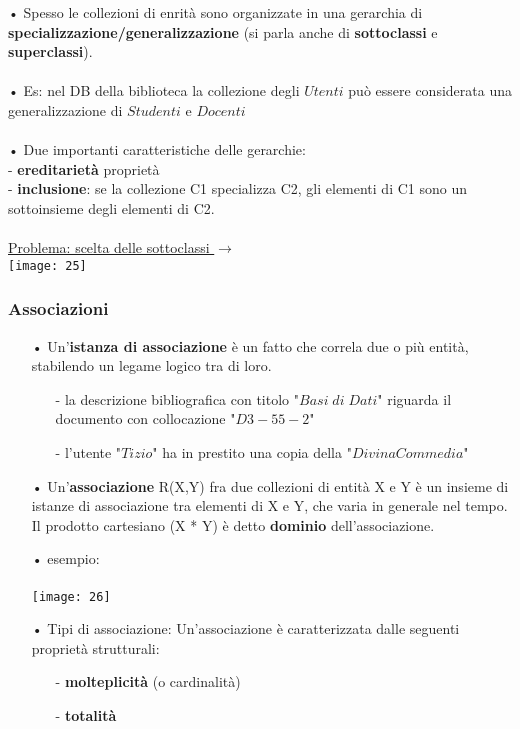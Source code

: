 \documentclass[12pt, letterpaper]{article}
\begin{document}
• Spesso le collezioni di enrità sono organizzate in una gerarchia di \textbf{specializzazione/generalizzazione} (si parla anche di 
\textbf{sottoclassi} e \textbf{superclassi}).
\\
\\
• Es: nel DB della biblioteca la collezione degli $Utenti$ può essere considerata una 
generalizzazione di $Studenti$ e $Docenti$
\\
\\
• Due importanti caratteristiche delle gerarchie:
\\- \textbf{ereditarietà} proprietà 
\\-\textbf{ inclusione}: se la collezione C1 specializza C2, gli elementi di C1 sono un sottoinsieme degli elementi di C2.
\\
\\
\underline{Problema: scelta delle sottoclassi $\rightarrow$}\\
\texttt{[image: 25]}

\subsubsection{Associazioni}

\begin{itemize}
   \item[•] Un'\textbf{istanza di associazione} è un fatto che correla due o più entità, 
      stabilendo un legame logico tra di loro.
      \begin{itemize}
         \item[-] la descrizione bibliografica con titolo "$Basi\;di\;Dati$" riguarda il documento 
            con collocazione "$D3-55-2$"
         \item[-] l'utente "$Tizio$" ha in prestito una copia della "$Divina Commedia$"
      \end{itemize}
   \item[•] Un'\textbf{associazione} R(X,Y) fra due collezioni di entità X e Y è un insieme di istanze 
      di associazione tra elementi di X e Y, che varia in generale nel tempo. Il prodotto cartesiano (X * Y) è 
      detto \textbf{dominio} dell'associazione.
   \item[•] esempio:
      \\
      \\
      \texttt{[image: 26]}
   \item[•] Tipi di associazione: Un'associazione è caratterizzata dalle seguenti proprietà strutturali:
      \begin{itemize}
         \item[-] \textbf{molteplicità} (o cardinalità)
         \item[-] \textbf{totalità}
      \end{itemize}
\end{itemize}
\end{document}
